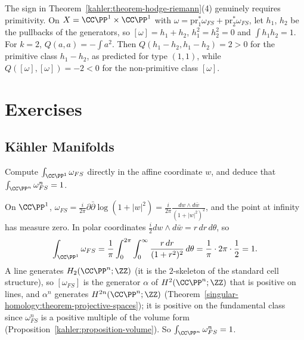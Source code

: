 \begin{counterexample}\label{kahler:counterexample-non-primitive-sign}
The sign in Theorem~\ref{kahler:theorem-hodge-riemann}(4) genuinely requires primitivity. On $X = \CC\PP^1 \times \CC\PP^1$ with
$\omega = \mathrm{pr}_1^*\omega_{FS} + \mathrm{pr}_2^*\omega_{FS}$, let $h_1$, $h_2$ be the pullbacks of the generators, so $[\omega] = h_1 + h_2$,
$h_1^2 = h_2^2 = 0$ and $\int h_1h_2 = 1$. For $k = 2$, $Q(a, a) = -\int a^2$. Then $Q(h_1 - h_2, h_1 - h_2) = 2 > 0$ for the primitive class
$h_1 - h_2$, as predicted for type $(1,1)$, while $Q([\omega], [\omega]) = -2 < 0$ for the non-primitive class $[\omega]$.
\end{counterexample}

\section{Exercises}\label{kahler:section-exercises}

\subsection{K\"ahler Manifolds}\label{kahler:subsection-exercises-kahler-manifolds}

\begin{exercise}\label{kahler:exercise-fubini-study-line}
Compute $\int_{\CC\PP^1}\omega_{FS}$ directly in the affine coordinate $w$, and deduce that $\int_{\CC\PP^n}\omega_{FS}^n = 1$.
\end{exercise}

\begin{solution}
On $\CC\PP^1$, $\omega_{FS} = \frac{i}{2\pi}\partial\bar\partial\log(1 + |w|^2) = \frac{i}{2\pi}\frac{dw \wedge d\bar w}{(1 + |w|^2)^2}$, and the
point at infinity has measure zero. In polar coordinates $\frac{i}{2}dw \wedge d\bar w = r\,dr\,d\theta$, so
\[
\int_{\CC\PP^1}\omega_{FS} = \frac1\pi\int_0^{2\pi}\int_0^\infty\frac{r\,dr}{(1 + r^2)^2}\,d\theta = \frac1\pi \cdot 2\pi \cdot \frac12 = 1 .
\]
A line generates $H_2(\CC\PP^n; \ZZ)$ (it is the $2$-skeleton of the standard cell structure), so $[\omega_{FS}]$ is the generator $\alpha$
of $H^2(\CC\PP^n; \ZZ)$ that is positive on lines, and
$\alpha^n$ generates $H^{2n}(\CC\PP^n; \ZZ)$ (Theorem~\ref{singular-homology:theorem-projective-spaces}); it is positive on the
fundamental class since $\omega_{FS}^n$ is a positive multiple of the volume form (Proposition~\ref{kahler:proposition-volume}). So
$\int_{\CC\PP^n}\omega_{FS}^n = 1$.
\end{solution}

